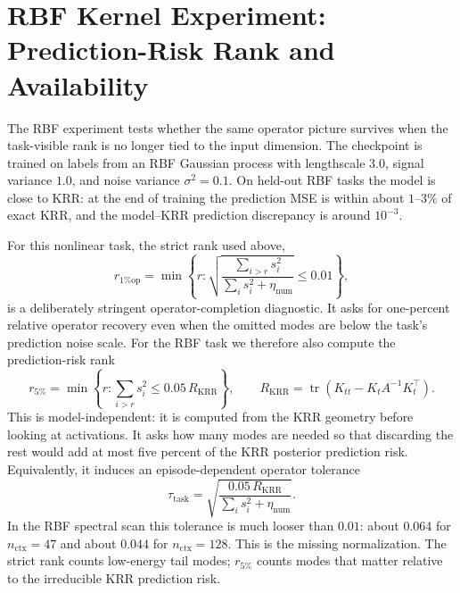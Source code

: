 \documentclass[11pt]{article}
\begin{document}
\section{RBF Kernel Experiment: Prediction-Risk Rank and Availability}

The RBF experiment tests whether the same operator picture survives when the task-visible rank is no
longer tied to the input dimension. The checkpoint is trained on labels from an RBF Gaussian process
with lengthscale \(3.0\), signal variance \(1.0\), and noise variance \(\sigma^2=0.1\). On held-out RBF
tasks the model is close to KRR: at the end of training the prediction MSE is within about
\(1\)--\(3\%\) of exact KRR, and the model--KRR prediction discrepancy is around \(10^{-3}\).

For this nonlinear task, the strict rank used above,
\[
r_{1\%\mathrm{op}}
=
\min\left\{r:
\sqrt{\frac{\sum_{i>r}s_i^2}{\sum_i s_i^2+\eta_{\mathrm{num}}}}
\le 0.01
\right\},
\]
is a deliberately stringent operator-completion diagnostic. It asks for one-percent relative
operator recovery even when the omitted modes are below the task's prediction noise scale. For the
RBF task we therefore also compute the prediction-risk rank
\[
r_{5\%}
=
\min\left\{r:\sum_{i>r}s_i^2\le 0.05\,R_{\mathrm{KRR}}\right\},
\qquad
R_{\mathrm{KRR}}
=
\operatorname{tr}\!\left(K_{tt}-K_tA^{-1}K_t^\top\right).
\]
This is model-independent: it is computed from the KRR geometry before looking at activations. It
asks how many modes are needed so that discarding the rest would add at most five percent of the KRR
posterior prediction risk. Equivalently, it induces an episode-dependent operator tolerance
\[
\tau_{\mathrm{task}}
=
\sqrt{\frac{0.05\,R_{\mathrm{KRR}}}{\sum_i s_i^2+\eta_{\mathrm{num}}}}.
\]
In the RBF spectral scan this tolerance is much looser than \(0.01\): about \(0.064\) for
\(n_{\mathrm{ctx}}=47\) and about \(0.044\) for \(n_{\mathrm{ctx}}=128\). This is the missing
normalization. The strict rank counts low-energy tail modes; \(r_{5\%}\) counts modes that matter
relative to the irreducible KRR prediction risk.
\end{document}
